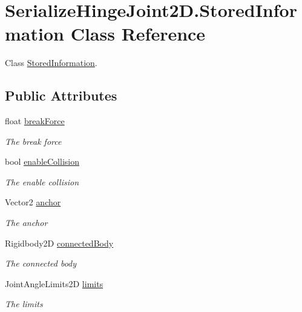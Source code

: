 \hypertarget{class_serialize_hinge_joint2_d_1_1_stored_information}{}\section{Serialize\+Hinge\+Joint2\+D.\+Stored\+Information Class Reference}
\label{class_serialize_hinge_joint2_d_1_1_stored_information}


Class \hyperlink{class_serialize_hinge_joint2_d_1_1_stored_information}{Stored\+Information}.  


\subsection*{Public Attributes}
\begin{DoxyCompactItemize}
\item 
float \hyperlink{class_serialize_hinge_joint2_d_1_1_stored_information_a1f6f75cc7759f5d9556ee62b23e8411d}{break\+Force}
\begin{DoxyCompactList}\small\item\em The break force \end{DoxyCompactList}\item 
bool \hyperlink{class_serialize_hinge_joint2_d_1_1_stored_information_ab2fc2f7243fc736013f3d95c03f8685d}{enable\+Collision}
\begin{DoxyCompactList}\small\item\em The enable collision \end{DoxyCompactList}\item 
Vector2 \hyperlink{class_serialize_hinge_joint2_d_1_1_stored_information_a3c4a84445a7c8d7d6f7d3ae85be78b65}{anchor}
\begin{DoxyCompactList}\small\item\em The anchor \end{DoxyCompactList}\item 
Rigidbody2D \hyperlink{class_serialize_hinge_joint2_d_1_1_stored_information_aa0c9430366a66c6b30117412632a59cb}{connected\+Body}
\begin{DoxyCompactList}\small\item\em The connected body \end{DoxyCompactList}\item 
Joint\+Angle\+Limits2D \hyperlink{class_serialize_hinge_joint2_d_1_1_stored_information_acb87d2266cc01d851fba7a9269cc2bfb}{limits}
\begin{DoxyCompactList}\small\item\em The limits \end{DoxyCompactList}\item 

\end{DoxyCompactItemize}
